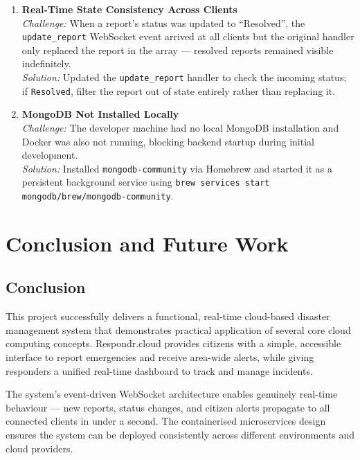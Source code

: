 \documentclass[12pt, a4paper]{report}
\begin{document}
\begin{enumerate}[leftmargin=*, label=\textbf{C\arabic*.}]
  \item \textbf{Real-Time State Consistency Across Clients}\\
  \textit{Challenge:} When a report's status was updated to ``Resolved'', the \texttt{update\_report} WebSocket event arrived at all clients but the original handler only replaced the report in the array --- resolved reports remained visible indefinitely.\\[4pt]
  \textit{Solution:} Updated the \texttt{update\_report} handler to check the incoming status; if \texttt{Resolved}, filter the report out of state entirely rather than replacing it.

  \item \textbf{MongoDB Not Installed Locally}\\
  \textit{Challenge:} The developer machine had no local MongoDB installation and Docker was also not running, blocking backend startup during initial development.\\[4pt]
  \textit{Solution:} Installed \texttt{mongodb-community} via Homebrew and started it as a persistent background service using \texttt{brew services start mongodb/brew/mongodb-community}.

\end{enumerate}

\chapter{Conclusion and Future Work}

\section{Conclusion}

This project successfully delivers a functional, real-time cloud-based disaster management system that demonstrates practical application of several core cloud computing concepts. Respondr.cloud provides citizens with a simple, accessible interface to report emergencies and receive area-wide alerts, while giving responders a unified real-time dashboard to track and manage incidents.

The system's event-driven WebSocket architecture enables genuinely real-time behaviour --- new reports, status changes, and citizen alerts propagate to all connected clients in under a second. The containerised microservices design ensures the system can be deployed consistently across different environments and cloud providers.
\end{document}
